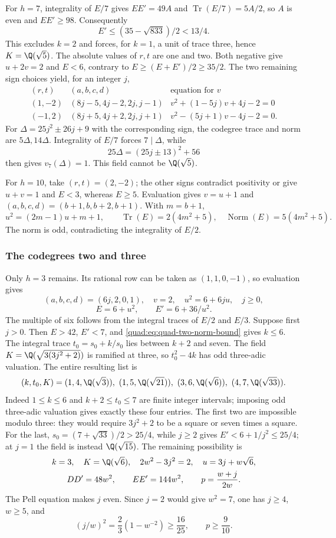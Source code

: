 For $h=7$, integrality of $E/7$ gives $EE'=49A$ and
$\operatorname{Tr}(E/7)=5A/2$, so $A$ is even and $EE'\ge98$.
Consequently
\[
 E'\le(35-\sqrt{833})/2<13/4.
\]
This excludes $k=2$ and forces, for $k=1$, a unit of trace three,
hence $K=\Q(\sqrt5)$. The absolute values of $r,t$ are
one and two. Both negative give $u+2v=2$ and $E<6$, contrary to
$E\ge(E+E')/2\ge35/2$.
The two remaining sign choices yield, for an integer $j$,
\[
\begin{array}{c|c|c}
(r,t)&(a,b,c,d)&\text{equation for }v\\\hline
(1,-2)&(8j-5,4j-2,2j,j-1)&v^2+(1-5j)v+4j-2=0\\
(-1,2)&(8j+5,4j+2,2j,j+1)&v^2-(5j+1)v-4j-2=0.
\end{array}
\]
For $\Delta=25j^2\pm26j+9$ with the corresponding sign, the
codegree trace and norm are $5\Delta,14\Delta$.
Integrality of $E/7$ forces $7\mid\Delta$, while
\[
 25\Delta=(25j\pm13)^2+56
\]
then gives $v_7(\Delta)=1$. This field cannot be $\Q(\sqrt5)$.

For $h=10$, take $(r,t)=(2,-2)$; the other signs contradict
positivity or give $u+v=1$ and $E<3$, whereas $E\ge5$.
Evaluation gives $v=u+1$ and
$(a,b,c,d)=(b+1,b,b+2,b+1)$. With $m=b+1$,
\[
 u^2=(2m-1)u+m+1,\qquad
 \operatorname{Tr}(E)=2(4m^2+5),\quad
 \operatorname{Norm}(E)=5(4m^2+5).
\]
The norm is odd, contradicting the integrality of $E/2$.

\subsubsection{The codegrees two and three}

Only $h=3$ remains. Its rational row can be taken as $(1,1,0,-1)$,
so evaluation gives
\[
 (a,b,c,d)=(6j,2,0,1),\quad
 v=2,\quad u^2=6+6ju,\quad j\ge0,
\]
\[
 E=6+u^2,\qquad E'=6+36/u^2.
\]
The multiple of six follows from the integral traces of $E/2$ and
$E/3$.
Suppose first $j>0$. Then $E>42$, $E'<7$, and
\eqref{quad:eq:quad-two-norm-bound} gives $k\le6$.
The integral trace $t_0=s_0+k/s_0$ lies between $k+2$ and seven.
The field $K=\Q(\sqrt{3(3j^2+2)})$ is ramified at three,
so $t_0^2-4k$ has odd three-adic valuation.
The entire resulting list is
\[
 (k,t_0,K)=(1,4,\Q(\sqrt3)),\
 (1,5,\Q(\sqrt{21})),\
 (3,6,\Q(\sqrt6)),\
 (4,7,\Q(\sqrt{33})).
\]
Indeed $1\le k\le6$ and $k+2\le t_0\le7$ are finite integer
intervals; imposing odd three-adic valuation gives exactly these
four entries. The first two are impossible modulo three: they
would require $3j^2+2$ to be a square or seven times a square.
For the last, $s_0=(7+\sqrt{33})/2>25/4$, while $j\ge2$ gives
$E'<6+1/j^2\le25/4$; at $j=1$ the field is instead
$\Q(\sqrt{15})$.
The remaining possibility is
\begin{equation}\label{quad:eq:quad-two-pell}
 \begin{gathered}
 k=3,\quad K=\Q(\sqrt6),\quad
 2w^2-3j^2=2,\quad u=3j+w\sqrt6,\\
 DD'=48w^2,\qquad EE'=144w^2,\qquad
 p=\frac{w+j}{2w}.
 \end{gathered}
\end{equation}
The Pell equation makes $j$ even. Since $j=2$ would give $w^2=7$,
one has $j\ge4$, $w\ge5$, and
\[
 (j/w)^2=\frac23(1-w^{-2})\ge\frac{16}{25},\qquad p\ge\frac9{10}.
\]


